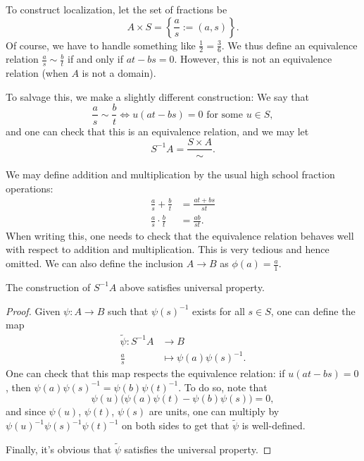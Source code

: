 To construct localization, let the set of fractions be
$$A\times S = \left\{\frac as := (a,s)\right\}.$$
Of course, we have to handle something like
$\frac 12 = \frac 36$. We thus define an equivalence relation
$\frac as \sim \frac bt$ if and only if $at-bs=0$.
However, this is not an
equivalence relation (when $A$ is not a domain).

To salvage this, we make a slightly different construction:
We say that
$$\frac as\sim\frac bt\iff u(at-bs)=0\text{ for some } u\in S,$$
and one can check that this is an equivalence relation,
and we may let
$$S^{-1}A = \frac{S\times A}{\sim}.$$

We may define addition and multiplication by
the usual high school fraction operations:
\begin{align*}
    \frac as + \frac bt &= \frac{at+bs}{st} \\
    \frac as \cdot\frac bt &= \frac{ab}{st}.
\end{align*}
When writing this, one needs to check that the 
equivalence relation behaves
well with respect to addition and multiplication.
This is very tedious and hence omitted.
We can also define the inclusion $A\to B$ as
$\phi(a)=\frac a1$.
\begin{proposition}
    The construction of $S^{-1}A$ above
    satisfies universal property.
\end{proposition}
\begin{proof}
    Given $\psi : A\to B$ such that $\psi(s)^{-1}$ exists
    for all $s\in S$,
    one can define the map
    \begin{align*}
	\widetilde\psi : S^{-1}A &\to B \\
	\frac as &\mapsto \psi(a)\psi(s)^{-1}.
    \end{align*}
    One can check that this map respects the 
    equivalence relation: 
    if $u(at-bs)=0$, then $\psi(a)\psi(s)^{-1}
    = \psi(b)\psi(t)^{-1}$. To do so, note that
    $$\psi(u)\Big(\psi(a)\psi(t) - \psi(b)\psi(s)\Big) = 0,$$
    and since $\psi(u)$, $\psi(t)$, $\psi(s)$ are units,
    one can multiply by $\psi(u)^{-1}\psi(s)^{-1}\psi(t)^{-1}$
    on both sides to get that $\widetilde\psi$ is well-defined.

    Finally, it's obvious that $\widetilde\psi$
    satisfies the universal property.
\end{proof}
%
%
%
%
%
